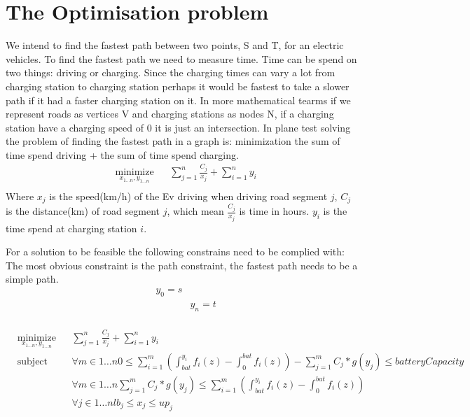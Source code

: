 \section{The Optimisation problem}

We intend to find the fastest path between two points, S and T, for an electric vehicles. To find the fastest path we need to measure time. Time can be spend on two things: driving or charging. Since the charging times can vary a lot from charging station to charging station perhaps it would be fastest to take a slower path if it had a faster charging station on it. In more mathematical tearms if we represent roads as vertices V and charging stations as nodes N, if a charging station have a charging speed of 0 it is just an intersection. In plane test solving the problem of finding the fastest path in a graph is: 
minimization the sum of time spend driving + the sum of time spend charging. 
\begin{equation}
\begin{aligned}
& \underset{x_{1 \dots n},y_{1 \dots n}}{\text{minimize}}
& & \sum_{j=1}^{n} \frac{C_j}{x_j} + \sum_{i=1}^{n} y_i \\
\end{aligned}
\end{equation}\label{eq:objfunction}
Where $x_j$ is the speed(km/h) of the Ev driving when driving road segment $j$, $C_j$ is the distance(km) of road segment $j$, which mean $\frac{C_j}{x_j}$ is time in hours. $y_i$ is the time spend at charging station $i$.  

For a solution to be feasible the following constrains need to be complied with: 
The most obvious constraint is the path constraint, the fastest path needs to be a simple path. 
\begin{equation}
\begin{aligned}
& y_0 = s \\
& & y_n = t \\
\end{aligned}
\end{equation}\label{eq:pathconstration} 

\begin{equation}
\begin{aligned}
& \underset{x_{1 \dots n},y_{1 \dots n}}{\text{minimize}}
& & \sum_{j=1}^{n} \frac{C_j}{x_j} + \sum_{i=1}^{n} y_i \\
& \text{subject to} 
& & \forall{m \in 1 \dots n} 0 \leq \sum_{i=1}^{m} \left( \int_{bat}^{y_i} f_i(z) - \int_{0}^{bat} f_i(z)\right) - \sum_{j=1}^{m} C_j*g(y_j) \leq batteryCapacity \\
&&& \forall{m \in 1 \dots n} \sum_{j=1}^{m} C_j*g(y_j) \leq \sum_{i=1}^{m} \left( \int_{bat}^{y_i} f_i(z) - \int_{0}^{bat} f_i(z)\right) \\
&&& \forall{j \in 1 \dots n} lb_j \leq x_j \leq up_j
\end{aligned}
\end{equation}\label{eq:optipro}

